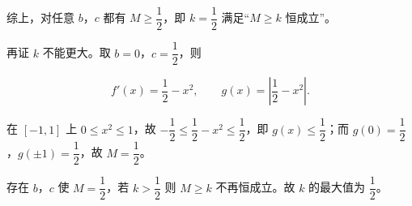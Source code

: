 \begin{answer}
综上，对任意 $b$，$c$ 都有 $M\geqslant\dfrac12$，即 $k=\dfrac12$ 满足“$M\geqslant k$ 恒成立”。

再证 $k$ 不能更大。取 $b=0$，$c=\dfrac12$，则

\nopagebreak[4]
\[f'(x)=\frac12-x^2,\qquad g(x)=\left|\frac12-x^2\right|.\]

在 $[-1,1]$ 上 $0\leqslant x^2\leqslant1$，故 $-\dfrac12\leqslant\dfrac12-x^2\leqslant\dfrac12$，即 $g(x)\leqslant\dfrac12$；而 $g(0)=\dfrac12$，$g(\pm1)=\dfrac12$，故 $M=\dfrac12$。

存在 $b$，$c$ 使 $M=\dfrac12$，若 $k>\dfrac12$ 则 $M\geqslant k$ 不再恒成立。故 $k$ 的最大值为 $\dfrac12$。


\end{answer}